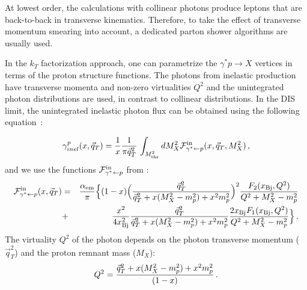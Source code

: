 At lowest order, the calculations with collinear photons  produce leptons that are back-to-back in transverse kinematics. 
Therefore, to take the effect of transverse momentum smearing into account, a dedicated parton shower algorithms are usually used.

In the $k_T$ factorization approach, one can parametrize the $\gamma^*p \rightarrow X$ vertices in terms of the proton structure functions. The photons from inelastic production have transverse momenta and non-zero virtualities $Q^2$ and the unintegrated photon distributions are used, in contrast to collinear distributions.
In the DIS limit, the unintegrated inelastic photon flux can be obtained using the following equation~\cite{daSilveira:2014jla, Luszczak:2015aoa}:

\begin{eqnarray}
\gamma^p_{inel}(x,\vec{q}_T) = {1\over x} 
{1 \over \pi \vec{q}_T^2} \, \int_{M^2_{\rm thr}} dM_X^2 {\cal{F}}^{\mathrm{in}}_{\gamma^* \leftarrow p} (x,\vec{q}_T,M^2_X) \, ,
\end{eqnarray}
and we use the functions $ {\cal{F}}^{\mathrm{in}}_{\gamma^* \leftarrow p}$ from \cite{Budnev:1974de, Luszczak:2018ntp}:
\begin{eqnarray}
{\cal{F}}^{\mathrm{in}}_{\gamma^* \leftarrow p} (x,\vec{q}_T) &=& {\alpha_{\rm em} \over \pi} 
\Big\{(1-x) \Big( {\vec{q}_T^2 \over \vec{q}_T^2 + x (M_X^2 - m_p^2) + x^2 m_p^2  }\Big)^2  
{F_2(x_{\rm Bj},Q^2) \over Q^2 + M_X^2 - m_p^2}  \nonumber \\
&+& {x^2 \over 4 x^2_{\rm Bj}}  
{\vec{q}_T^2 \over \vec{q}_T^2 + x (M_X^2 - m_p^2) + x^2 m_p^2  }
{2 x_{\rm Bj} F_1(x_{\rm Bj},Q^2) \over Q^2 + M_X^2 - m_p^2} \Big\} \, .
\label{eq:flux_in}
\end{eqnarray}
The virtuality $Q^2$ of the photon depends on the photon transverse momentum ($\vec{q}_T^2$) and the proton remnant mass ($M_X$):
\begin{eqnarray}
Q^2 =  {\vec{q}_T^2 + x (M_X^2 - m_p^2) + x^2 m_p^2 \over (1-x)} \, .
\label{eq:q2}
\end{eqnarray}
